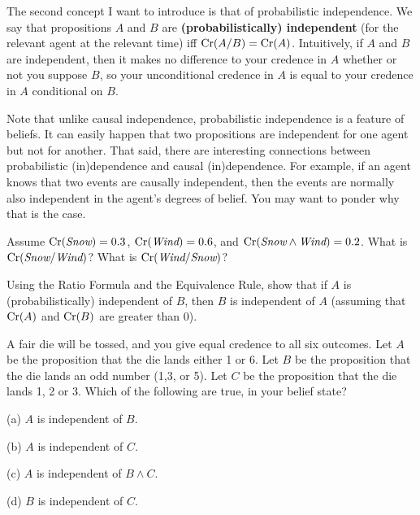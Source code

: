 The second concept I want to introduce is that of probabilistic
independence. We say that propositions $A$ and $B$ are
\textbf{(probabilistically) independent} (for the relevant agent at
the relevant time) iff $\text{Cr}(A/B) = \text{Cr}(A)$. Intuitively, if $A$ and $B$
are independent, then it makes no difference to your credence in $A$
whether or not you suppose $B$, so your unconditional credence in $A$
is equal to your credence in $A$ conditional on $B$.

Note that unlike causal independence, probabilistic independence is a
feature of beliefs. It can easily happen that two propositions are
independent for one agent but not for another. That said, there are
interesting connections between probabilistic (in)dependence and
causal (in)dependence. For example, if an agent knows that two events
are causally independent, then the events are normally also
independent in the agent's degrees of belief. You may want to ponder
why that is the case. 

\begin{exercise}{1}
  Assume $\text{Cr}(\emph{Snow}) = 0.3$, $\text{Cr}(\emph{Wind}) = 0.6$, and $\text{Cr}(\emph{Snow} \land
  \emph{Wind}) = 0.2$. What is $\text{Cr}(\emph{Snow}/\emph{Wind})$? What is $\text{Cr}(\emph{Wind}/\emph{Snow})$? 
\end{exercise}

\begin{exercise}{2}
  Using the Ratio Formula and the Equivalence Rule, show that if $A$ is
  (probabilistically) independent of $B$, then $B$ is independent of $A$
  (assuming that $\text{Cr}(A)$ and $\text{Cr}(B)$ are greater than 0).
\end{exercise}

\begin{exercise}{2}
  A fair die will be tossed, and you give equal credence to all six
  outcomes. Let $A$ be the proposition that the die lands either 1 or
  6. Let $B$ be the proposition that the die lands an odd number (1,3,
  or 5). Let $C$ be the proposition that the die lands 1, 2 or 3.
  Which of the following are true, in your belief state?
  \begin{exlist}
  \item[(a)] $A$ is independent of $B$. 
  \item[(b)] $A$ is independent of $C$.
  \item[(c)] $A$ is independent of $B \land C$.
  \item[(d)] $B$ is independent of $C$.
  \end{exlist}
\end{exercise}

